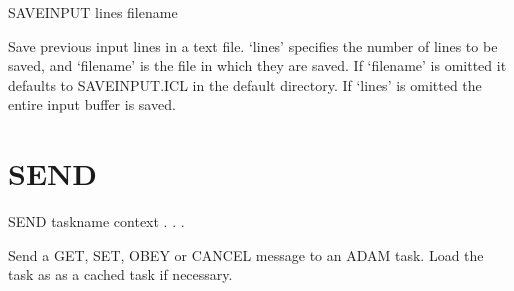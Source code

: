 \documentclass[twoside,11pt,nolof,chapters]{starlink}
\begin{document}
   SAVEINPUT \hspace{.5cm} lines \hspace{.5cm} filename

 Save previous input lines in a text file. `lines' specifies the number of
lines to be saved, and `filename' is the file in which they are saved. If
`filename' is omitted it defaults to SAVEINPUT.ICL in the default directory.
If `lines' is omitted the entire input buffer is saved.

\section{SEND\label{SEND}}

    SEND \hspace{.5cm} taskname \hspace{.5cm} context \hspace{.5cm} . . .

 Send a GET, SET, OBEY or CANCEL message to an ADAM task. Load the
 task as as a cached task if necessary.
\end{document}
